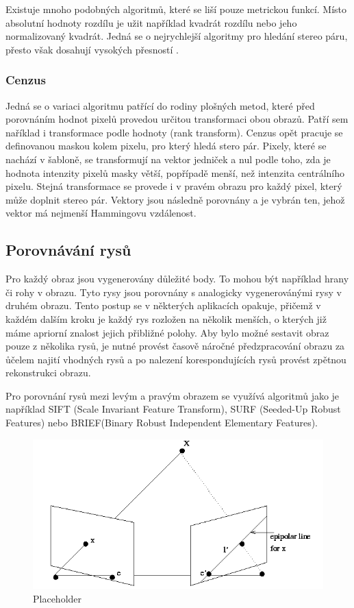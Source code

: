 \documentclass[twoside]{ctuthesis}
\begin{document}
    Existuje mnoho podobných algoritmů, které se liší pouze metrickou funkcí. Místo absolutní hodnoty rozdílu je užit například kvadrát rozdílu  nebo jeho normalizovaný kvadrát. Jedná se o nejrychlejší algoritmy pro hledání stereo páru, přesto však dosahují vysokých přesností \cite{kuhl2005comparison}. 

\subsubsection{Cenzus}
\label{Sec:cenzus}
Jedná se o variaci algoritmu patřící do rodiny plošných metod, které před porovnáním hodnot pixelů provedou určitou transformaci obou obrazů. Patří sem naříklad i transformace podle hodnoty (rank transform). Cenzus opět pracuje se definovanou maskou kolem pixelu, pro který hledá stero pár. Pixely, které se nachází v šabloně, se transformují na vektor jedniček a nul podle toho, zda je hodnota intenzity pixelů masky větší, popřípadě menší, než intenzita centrálního pixelu. Stejná transformace se provede i v pravém obrazu pro každý pixel, který může doplnit stereo pár. Vektory jsou následně porovnány a je vybrán ten, jehož vektor má nejmenší Hammingovu vzdálenost. \cite{kuhl2005comparison, brown2003advances_in_stereo}

\subsection{Porovnávání rysů}
Pro každý obraz jsou vygenerovány důležité body. To mohou být například hrany či rohy v obrazu. Tyto rysy jsou porovnány s analogicky vygenerovánými rysy v druhém obrazu. Tento postup se v některých aplikacích opakuje, přičemž v každém dalším kroku je každý rys rozložen na několik menších, o kterých již máme apriorní znalost jejich přibližné polohy. Aby bylo možné sestavit obraz pouze z několika rysů, je nutné provést časově náročné předzpracování obrazu za ůčelem najití vhodných rysů a po nalezení korespondujících rysů provést zpětnou rekonstrukci obrazu. \cite{brown2003advances_in_stereo}

Pro porovnání rysů mezi levým a pravým obrazem se využívá algoritmů jako je například SIFT (Scale Invariant Feature Transform), SURF (Seeded-Up Robust Features) nebo BRIEF(Binary Robust Independent Elementary Features).

\begin{figure}
    \centering
    \includegraphics[width = 0.8\linewidth]{pictures/epipolar.png}
    \caption{Placeholder}
    \label{fig:epipolar}
\end{figure}
\end{document}
